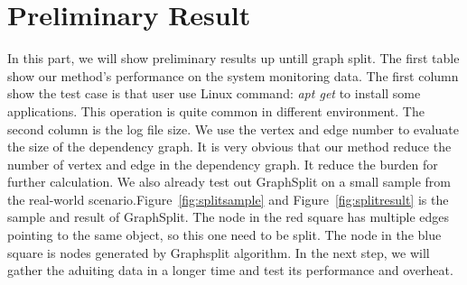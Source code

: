

\section{Preliminary Result}

In this part, we will show preliminary results up untill graph split. The first table show our method's performance on the system monitoring data. The first column show the test case is that user use Linux command: \textit{apt get} to install some applications. This operation is quite common in different environment. The second column is the log file size. We use the vertex and edge number to evaluate the size of the dependency graph. It is very obvious that our method reduce the number of vertex and edge in the dependency graph.  It reduce the burden for further calculation. We also already test out GraphSplit on a small sample from the real-world scenario.Figure~\ref{fig:splitsample} and Figure~\ref{fig:splitresult} is the sample and result of GraphSplit. The node in the red square has multiple edges pointing to the same object, so this one need to be split. The node in the blue square is nodes generated by Graphsplit algorithm. In the next step, we will gather the aduiting data in a longer time and test its performance and overheat. 



